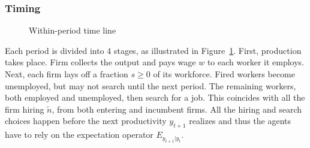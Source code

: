 \subsubsection*{Timing}
    \begin{figure}
        \centering
{}
\caption{Within-period time line} \label{fig:Timing}
\end{figure}

Each period is divided into 4 stages, as illustrated in Figure~\ref{fig:Timing}. First, production takes place. Firm collects the output and pays wage $w$ to each worker it employs. Next, each firm lays off a fraction $s\geq 0$ of its workforce. Fired workers become unemployed, but may not search until the next period. The remaining workers, both employed and unemployed, then search for a job. This coincides with all the firm hiring $\tilde{n}$, from both entering and incumbent firms. All the hiring and search choices happen before the next productivity $y_{t+1}$ realizes and thus the agents have to rely on the expectation operator $E_{y_{t+1}|y_t}$.
